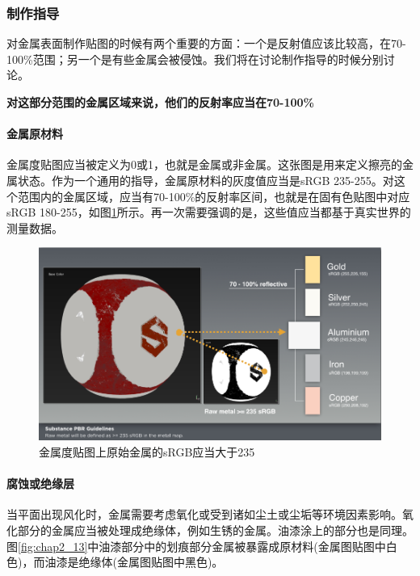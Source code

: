 \subsubsection{制作指导}

对金属表面制作贴图的时候有两个重要的方面：一个是反射值应该比较高，在70-100\%范围；另一个是有些金属会被侵蚀。我们将在讨论制作指导的时候分别讨论。

\textbf{对这部分范围的金属区域来说，他们的反射率应当在70-100\%}

\paragraph{金属原材料}

金属度贴图应当被定义为0或1，也就是金属或非金属。这张图是用来定义擦亮的金属状态。作为一个通用的指导，金属原材料的灰度值应当是sRGB 235-255。对这个范围内的金属区域，应当有70-100\%的反射率区间，也就是在固有色贴图中对应sRGB 180-255，如图\ref{fig:chap2_12}所示。再一次需要强调的是，这些值应当都基于真实世界的测量数据。

\begin{figure}[ht]
    \centering
	\includegraphics[width=\textwidth]{images/chap2_12.png}
	\caption{金属度贴图上原始金属的sRGB应当大于235}
    \label{fig:chap2_12}
\end{figure}

\paragraph{腐蚀或绝缘层}

当平面出现风化时，金属需要考虑氧化或受到诸如尘土或尘垢等环境因素影响。氧化部分的金属应当被处理成绝缘体，例如生锈的金属。油漆涂上的部分也是同理。图\ref{fig:chap2_13}中油漆部分中的划痕部分金属被暴露成原材料(金属图贴图中白色)，而油漆是绝缘体(金属图贴图中黑色)。


